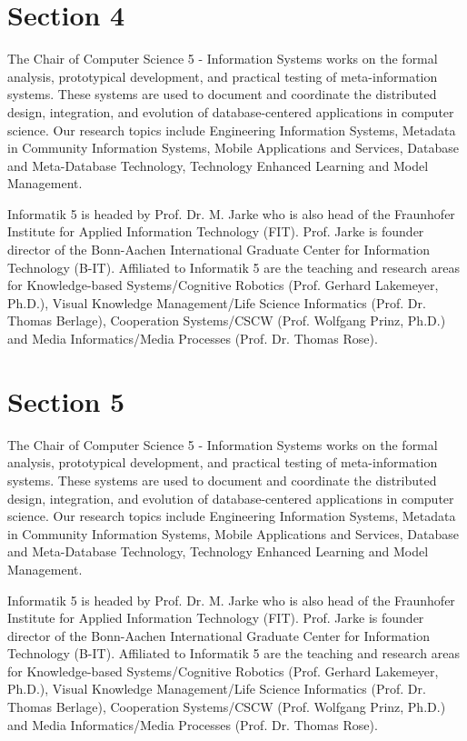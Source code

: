 \section{Section 4}


The Chair of Computer Science 5 - Information Systems works on the formal
analysis, prototypical development, and practical testing of meta-information
systems. These systems are used to document and coordinate the distributed
design, integration, and evolution of database-centered applications in computer
science. Our research topics include Engineering Information Systems, Metadata
in Community Information Systems, Mobile Applications and Services, Database and
Meta-Database Technology, Technology Enhanced Learning and Model Management.

Informatik 5 is headed by Prof. Dr. M. Jarke who is also head of the Fraunhofer
Institute for Applied Information Technology (FIT). Prof. Jarke is founder
director of the Bonn-Aachen International Graduate Center for Information
Technology (B-IT). Affiliated to Informatik 5 are the teaching and research
areas for Knowledge-based Systems/Cognitive Robotics (Prof. Gerhard Lakemeyer,
Ph.D.), Visual Knowledge Management/Life Science Informatics (Prof. Dr. Thomas
Berlage), Cooperation Systems/CSCW (Prof. Wolfgang Prinz, Ph.D.) and Media
Informatics/Media Processes (Prof. Dr. Thomas Rose).


\section{Section 5}


The Chair of Computer Science 5 - Information Systems works on the formal
analysis, prototypical development, and practical testing of meta-information
systems. These systems are used to document and coordinate the distributed
design, integration, and evolution of database-centered applications in computer
science. Our research topics include Engineering Information Systems, Metadata
in Community Information Systems, Mobile Applications and Services, Database and
Meta-Database Technology, Technology Enhanced Learning and Model Management.

Informatik 5 is headed by Prof. Dr. M. Jarke who is also head of the Fraunhofer
Institute for Applied Information Technology (FIT). Prof. Jarke is founder
director of the Bonn-Aachen International Graduate Center for Information
Technology (B-IT). Affiliated to Informatik 5 are the teaching and research
areas for Knowledge-based Systems/Cognitive Robotics (Prof. Gerhard Lakemeyer,
Ph.D.), Visual Knowledge Management/Life Science Informatics (Prof. Dr. Thomas
Berlage), Cooperation Systems/CSCW (Prof. Wolfgang Prinz, Ph.D.) and Media
Informatics/Media Processes (Prof. Dr. Thomas Rose).


